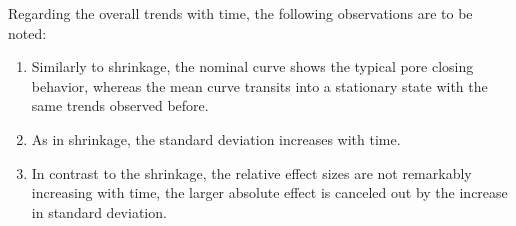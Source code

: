 Regarding the overall trends with time, the following observations are to be noted:
\begin{enumerate}
    \item Similarly to shrinkage, the nominal curve shows the typical pore closing behavior, whereas the mean curve transits into a stationary state with the same trends observed before.
    \item As in shrinkage, the standard deviation increases with time.
    \item In contrast to the shrinkage, the relative effect sizes are not remarkably increasing with time, the larger absolute effect is canceled out by the increase in standard deviation.
\end{enumerate}
